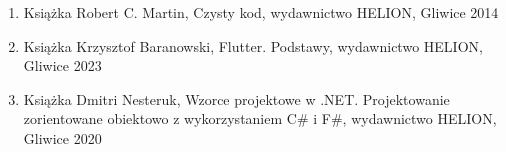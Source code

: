 \documentclass[a4paper,twoside,12pt]{book}
\begin{document}
\begin{appendices}
\begin{enumerate}
    \item Książka Robert C. Martin, Czysty kod, wydawnictwo HELION, Gliwice 2014
    \item Książka Krzysztof Baranowski, Flutter. Podstawy, wydawnictwo HELION, Gliwice 2023
    \item Książka Dmitri Nesteruk, Wzorce projektowe w .NET. Projektowanie zorientowane obiektowo z wykorzystaniem C\# i F\#, wydawnictwo HELION, Gliwice 2020
\end{enumerate}









\listoffigures
{}

\end{appendices}
\end{document}
